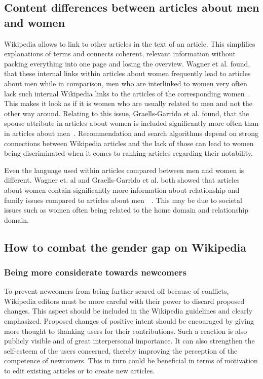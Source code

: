 \documentclass[a4paper, 11pt]{article}
\begin{document}
\subsection{Content differences between articles about men and women} \label{sec:gender-gap-wikipedia:contentdiff}
Wikipedia allows to link to other articles in the text of an article. This simplifies explanations of terms and connects coherent, relevant information without packing everything into one page and losing the overview. Wagner et al. found, that these internal links within articles about women frequently lead to articles about men while in comparison, men who are interlinked to women very often lack such internal Wikipedia links to the articles of the corresponding women~\cite{wagner2015s}. This makes it look as if it is women who are usually related to men and not the other way around. Relating to this issue, Graells-Garrido et al. found, that the spouse attribute in articles about women is included significantly more often than in articles about men~\cite{graells2015first}. Recommendation and search algorithms depend on strong connections between Wikipedia articles and the lack of those can lead to women being discriminated when it comes to ranking articles regarding their notability.

Even the language used within articles compared between men and women is different. Wagner et. al and Graells-Garrido et al. both showed that articles about women contain significantly more information about relationship and family issues compared to articles about men~\cite{wagner2015s}~\cite{graells2015first}. This may be due to societal issues such as women often being related to the home domain and relationship domain.

\subsection{How to combat the gender gap on Wikipedia} \label{sec:gender-gap-wikipedia:combatgap}
\subsubsection{Being more considerate towards newcomers} \label{sec:gender-gap-wikipedia:newcomers}
To prevent newcomers from being further scared off because of conflicts, Wikipedia editors must be more careful with their power to discard proposed changes. This aspect should be included in the Wikipedia guidelines and clearly emphasized. Proposed changes of positive intent should be encouraged by giving more thought to thanking users for their contributions. Such a reaction is also publicly visible and of great interpersonal importance. It can also strengthen the self-esteem of the users concerned, thereby improving the perception of the competence of newcomers. This in turn could be beneficial in terms of motivation to edit existing articles or to create new articles.
\end{document}
